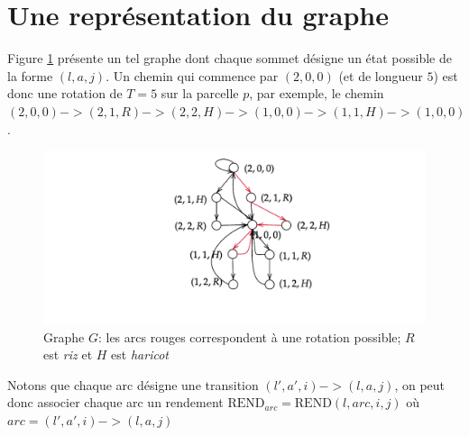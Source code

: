 \documentclass[a4paper]{article}
\begin{document}
\section{Une représentation du graphe}
Figure \ref{fig:diam} présente un tel graphe dont chaque sommet désigne un état possible de la forme $(l,a,j)$. Un chemin qui commence par $(2,0,0)$ (et de longueur $5$) est donc une rotation de $T=5$ sur la parcelle $p$, par exemple, le chemin $(2,0,0)->(2,1,R)->(2,2,H)->(1,0,0)->(1,1,H)->(1,0,0)$. 
\begin{figure}[h!t]
    \centering
    \includegraphics[width=\textwidth]{diagram.pdf}
    \caption{Graphe $G$: les arcs rouges correspondent à une rotation possible; $R$ est \textit{riz} et $H$ est \textit{haricot}}
    \label{fig:diam}
\end{figure}
Notons que chaque arc désigne une transition $(l',a',i) -> (l,a,j)$, on peut donc associer chaque arc un rendement $\text{REND}_{arc} = \text{REND}(l,arc,i,j)$ où $arc = (l',a',i) -> (l,a,j)$
\end{document}
